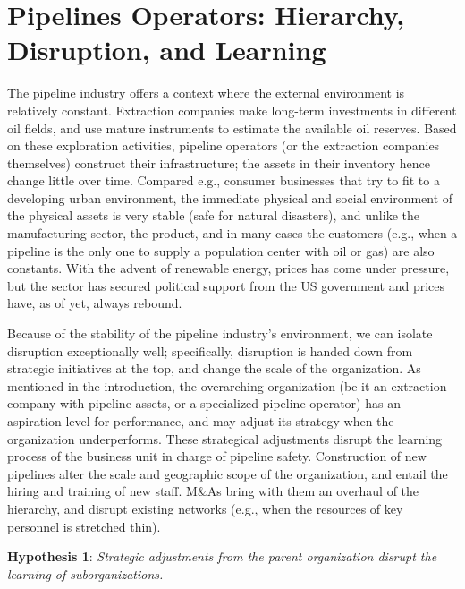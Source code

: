 \section{Pipelines Operators: Hierarchy, Disruption, and Learning}

The pipeline industry offers a context where the external environment is relatively constant. Extraction companies make long-term investments in different oil fields, and use mature instruments to estimate the available oil reserves. Based on these exploration activities, pipeline operators (or the extraction companies themselves) construct their infrastructure; the assets in their inventory hence change little over time. Compared e.g., consumer businesses that try to fit to a developing urban environment, the immediate physical and social environment of the physical assets is very stable (safe for natural disasters), and unlike the manufacturing sector, the product, and in many cases the customers (e.g., when a pipeline is the only one to supply a population center with oil or gas) are also constants. With the advent of renewable energy, prices has come under pressure, but the sector has secured political support from the US government and prices have, as of yet, always rebound.

Because of the stability of the pipeline industry's environment, we can isolate disruption exceptionally well; specifically, disruption is handed down from strategic initiatives at the top, and change the scale of the organization. As mentioned in the introduction, the overarching organization (be it an extraction company with pipeline assets, or a specialized pipeline operator) has an aspiration level for performance, and may adjust its strategy when the organization underperforms. These strategical adjustments disrupt the learning process of the business unit in charge of pipeline safety. Construction of new pipelines alter the scale and geographic scope of the organization, and entail the hiring and training of new staff. M\&As bring with them an overhaul of the hierarchy, and disrupt existing networks (e.g., when the resources of key personnel is stretched thin). 

\textbf{Hypothesis 1}: \textit{Strategic adjustments from the parent organization disrupt the learning of suborganizations.}

